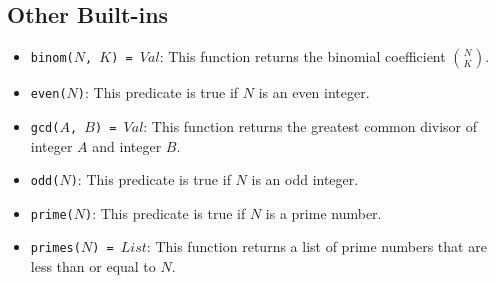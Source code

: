 \subsection{Other Built-ins}
\begin{itemize}
\item \texttt{binom($N$, $K$) = $Val$}: This function returns the binomial coefficient ${N \choose K}$. %
\item \texttt{even($N$)}: This predicate is true if $N$ is an even integer.
\item \texttt{gcd($A$, $B$) = $Val$}: This function returns the greatest common divisor of integer $A$ and integer $B$.
\item \texttt{odd($N$)}: This predicate is true if $N$ is an odd integer.
\item \texttt{prime($N$)}: This predicate is true if $N$ is a prime number.
\item \texttt{primes($N$) = $List$}: This function returns a list of prime numbers that are less than or equal to $N$.
\end{itemize}


\ignore{

}
